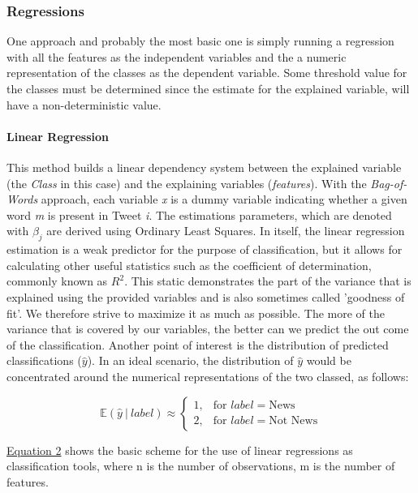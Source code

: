 	\subsubsection*{Regressions}
	One approach and probably the most basic one is simply running a regression with all the features as the independent variables and the a numeric representation of the classes as the dependent variable. Some threshold value for the classes must be determined since the estimate for the explained variable, will have a non-deterministic value.
	\par
	\paragraph{Linear Regression} 
	This method builds a linear dependency system between the explained variable (the \textit{Class} in this case) and the explaining variables (\textit{features}). With the \textit{Bag-of-Words} approach, each variable \textit{x} is a dummy variable indicating whether a given word \textit{m} is present in Tweet \textit{i}. The estimations parameters, which are denoted with $\beta_j$ are derived using Ordinary Least Squares. In itself, the linear regression estimation is a weak predictor for the purpose of classification, but it allows for calculating other useful statistics such as the coefficient of determination, commonly known as $R^2$. This static demonstrates the part of the variance that is explained using the provided variables and is also sometimes called 'goodness of fit'. We therefore strive to maximize it as much as possible. The more of the variance that is covered by our variables, the better can we predict the out come of the classification. Another point of interest is the distribution of predicted classifications ($\hat{y}$). In an ideal scenario, the distribution of $\hat{y}$ would be concentrated around the numerical representations of the two classed, as follows:
	
	\begin{equation}
	\mathbb{E}(\hat{y} \ \vert \ label) \approx \begin{cases}
	1,   & \text{for } label = \text{News}\\
	2, & \text{for } label = \text{Not News}
	\end{cases}
	\end{equation}
	
	\newpage
	
	\hyperref[Linear_Regression]{Equation 2} shows the basic scheme for the use of linear regressions as classification tools, where n is the number of observations, m is the number of features.
	

